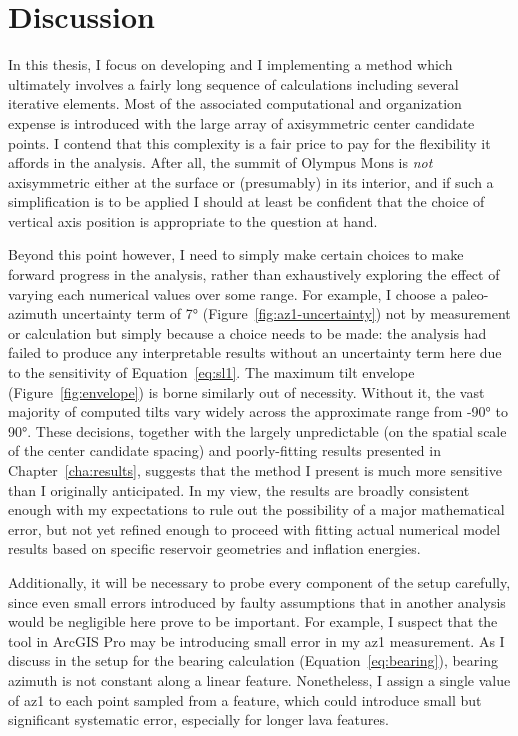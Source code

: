 \chapter{Discussion}\label{cha:discussion}

In this thesis, I focus on developing and I implementing a method which ultimately involves a fairly long sequence of calculations including several iterative elements. Most of the associated computational and organization expense is introduced with the large array of axisymmetric center candidate points. I contend that this complexity is a fair price to pay for the flexibility it affords in the analysis. After all, the summit of Olympus Mons is \emph{not} axisymmetric either at the surface or (presumably) in its interior, and if such a simplification is to be applied I should at least be confident that the choice of vertical axis position is appropriate to the question at hand.

Beyond this point however, I need to simply make certain choices to make forward progress in the analysis, rather than exhaustively exploring the effect of varying each numerical values over some range. For example, I choose a paleo-azimuth uncertainty term of \ang{7} (Figure~\ref{fig:az1-uncertainty}) not by measurement or calculation but simply because a choice needs to be made: the analysis had failed to produce any interpretable results without an uncertainty term here due to the sensitivity of Equation~\eqref{eq:sl1}. The maximum tilt envelope (Figure~\ref{fig:envelope}) is borne similarly out of necessity. Without it, the vast majority of computed tilts vary widely across the approximate range from \ang{-90} to \ang{90}. These decisions, together with the largely unpredictable (on the spatial scale of the center candidate spacing) and poorly-fitting results presented in Chapter~\ref{cha:results}, suggests that the method I present is much more sensitive than I originally anticipated. In my view, the results are broadly consistent enough with my expectations to rule out the possibility of a major mathematical error, but not yet refined enough to proceed with fitting actual numerical model results based on specific reservoir geometries and inflation energies.

Additionally, it will be necessary to probe every component of the setup carefully, since even small errors introduced by faulty assumptions that in another analysis would be negligible here prove to be important. For example, I suspect that the  tool in ArcGIS Pro may be introducing small error in my \acl{az1} measurement. As I discuss in the setup for the \acs{bearing} calculation (Equation~\eqref{eq:bearing}), bearing azimuth is not constant along a linear feature. Nonetheless, I assign a single value of \acs{az1} to each point sampled from a feature, which could introduce small but significant systematic error, especially for longer lava features. 

